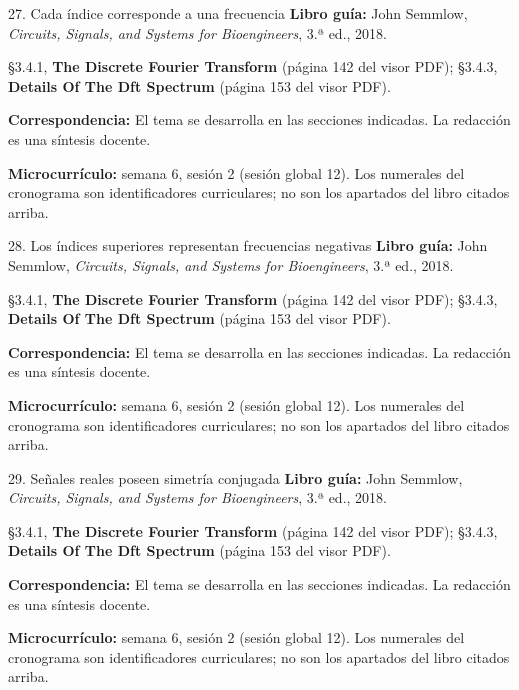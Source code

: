 \documentclass[
  10pt,
  ignorenonframetext,
  aspectratio=169,
  spanish,
]{beamer}
\begin{document}
\begin{frame}{27. Cada índice corresponde a una frecuencia}
\label{cada-uxedndice-corresponde-a-una-frecuencia}
\textbf{Libro guía:} John Semmlow, \emph{Circuits, Signals, and Systems
for Bioengineers}, 3.ª ed., 2018.

§3.4.1, \textbf{The Discrete Fourier Transform} (página 142 del visor
PDF); §3.4.3, \textbf{Details Of The Dft Spectrum} (página 153 del visor
PDF).

\textbf{Correspondencia:} El tema se desarrolla en las secciones
indicadas. La redacción es una síntesis docente.

\textbf{Microcurrículo:} semana 6, sesión 2 (sesión global 12). Los
numerales del cronograma son identificadores curriculares; no son los
apartados del libro citados arriba.
\end{frame}

\begin{frame}{28. Los índices superiores representan frecuencias
negativas}
\label{los-uxedndices-superiores-representan-frecuencias-negativas}
\textbf{Libro guía:} John Semmlow, \emph{Circuits, Signals, and Systems
for Bioengineers}, 3.ª ed., 2018.

§3.4.1, \textbf{The Discrete Fourier Transform} (página 142 del visor
PDF); §3.4.3, \textbf{Details Of The Dft Spectrum} (página 153 del visor
PDF).

\textbf{Correspondencia:} El tema se desarrolla en las secciones
indicadas. La redacción es una síntesis docente.

\textbf{Microcurrículo:} semana 6, sesión 2 (sesión global 12). Los
numerales del cronograma son identificadores curriculares; no son los
apartados del libro citados arriba.
\end{frame}

\begin{frame}{29. Señales reales poseen simetría conjugada}
\label{seuxf1ales-reales-poseen-simetruxeda-conjugada}
\textbf{Libro guía:} John Semmlow, \emph{Circuits, Signals, and Systems
for Bioengineers}, 3.ª ed., 2018.

§3.4.1, \textbf{The Discrete Fourier Transform} (página 142 del visor
PDF); §3.4.3, \textbf{Details Of The Dft Spectrum} (página 153 del visor
PDF).

\textbf{Correspondencia:} El tema se desarrolla en las secciones
indicadas. La redacción es una síntesis docente.

\textbf{Microcurrículo:} semana 6, sesión 2 (sesión global 12). Los
numerales del cronograma son identificadores curriculares; no son los
apartados del libro citados arriba.
\end{frame}
\end{document}
